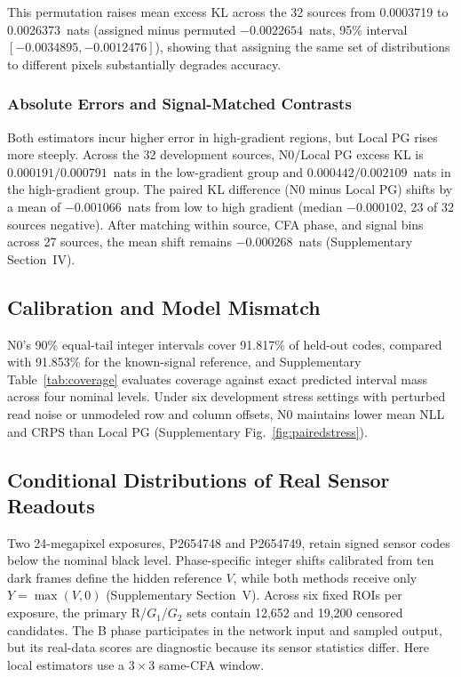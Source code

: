 \documentclass[10pt,twocolumn,journal]{IEEEtran}
\begin{document}
This permutation raises mean excess KL across the 32 sources from 0.0003719 to 0.0026373~nats (assigned minus permuted $-0.0022654$~nats, 95\% interval $[-0.0034895,-0.0012476]$), showing that assigning the same set of distributions to different pixels substantially degrades accuracy.

\subsubsection{Absolute Errors and Signal-Matched Contrasts}\label{sec:gradientcontrol}
Both estimators incur higher error in high-gradient regions, but Local PG rises more steeply. Across the 32 development sources, N0/Local PG excess KL is $0.000191/0.000791$~nats in the low-gradient group and $0.000442/0.002109$~nats in the high-gradient group. The paired KL difference (N0 minus Local PG) shifts by a mean of $-0.001066$~nats from low to high gradient (median $-0.000102$, 23 of 32 sources negative). After matching within source, CFA phase, and signal bins across 27 sources, the mean shift remains $-0.000268$~nats (Supplementary Section~IV).

\subsection{Calibration and Model Mismatch}
N0's 90\% equal-tail integer intervals cover 91.817\% of held-out codes, compared with 91.853\% for the known-signal reference, and Supplementary Table~\ref{tab:coverage} evaluates coverage against exact predicted interval mass across four nominal levels. Under six development stress settings with perturbed read noise or unmodeled row and column offsets, N0 maintains lower mean NLL and CRPS than Local PG (Supplementary Fig.~\ref{fig:pairedstress}).

\subsection{Conditional Distributions of Real Sensor Readouts}
Two 24-megapixel exposures, P2654748 and P2654749, retain signed sensor codes below the nominal black level. Phase-specific integer shifts calibrated from ten dark frames define the hidden reference $V$, while both methods receive only $Y=\max(V,0)$ (Supplementary Section~V). Across six fixed ROIs per exposure, the primary R/$G_1$/$G_2$ sets contain 12,652 and 19,200 censored candidates. The B phase participates in the network input and sampled output, but its real-data scores are diagnostic because its sensor statistics differ. Here local estimators use a $3\times3$ same-CFA window.
\end{document}
